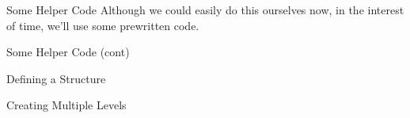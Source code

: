 \documentclass[10pt]{beamer}
\begin{document}
\begin{frame}{Some Helper Code}
	Although we could easily do this ourselves now, in the interest of time, we'll use some prewritten code.

	
\end{frame}

\begin{frame}{Some Helper Code (cont)}
	
\end{frame}

\begin{frame}{Defining a Structure}
	
\end{frame}

\begin{frame}{Creating Multiple Levels}
	
\end{frame}
\end{document}
